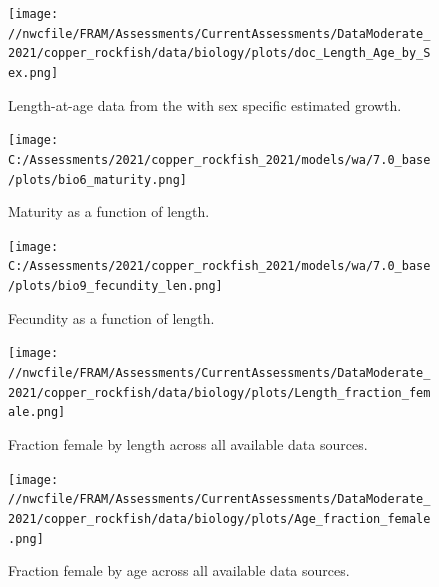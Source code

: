 \documentclass[11pt,
  english,
  a4paper,
]{article}
\begin{document}

\begin{figure}
\centering
\texttt{[image: //nwcfile/FRAM/Assessments/CurrentAssessments/DataModerate\_2021/copper\_rockfish/data/biology/plots/doc\_Length\_Age\_by\_Sex.png]}
\caption{Length-at-age data from the with sex specific estimated growth.\label{fig:len-age}}
\end{figure}

\tagmcend\tagstructend


\begin{figure}
\centering
\texttt{[image: C:/Assessments/2021/copper\_rockfish\_2021/models/wa/7.0\_base/plots/bio6\_maturity.png]}
\caption{Maturity as a function of length.\label{fig:maturity}}
\end{figure}

\tagmcend\tagstructend


\begin{figure}
\centering
\texttt{[image: C:/Assessments/2021/copper\_rockfish\_2021/models/wa/7.0\_base/plots/bio9\_fecundity\_len.png]}
\caption{Fecundity as a function of length.\label{fig:fecundity}}
\end{figure}

\tagmcend\tagstructend


\begin{figure}
\centering
\texttt{[image: //nwcfile/FRAM/Assessments/CurrentAssessments/DataModerate\_2021/copper\_rockfish/data/biology/plots/Length\_fraction\_female.png]}
\caption{Fraction female by length across all available data sources.\label{fig:len-sex-ratio}}
\end{figure}

\tagmcend\tagstructend


\begin{figure}
\centering
\texttt{[image: //nwcfile/FRAM/Assessments/CurrentAssessments/DataModerate\_2021/copper\_rockfish/data/biology/plots/Age\_fraction\_female.png]}
\caption{Fraction female by age across all available data sources.\label{fig:age-sex-ratio}}
\end{figure}
\end{document}
